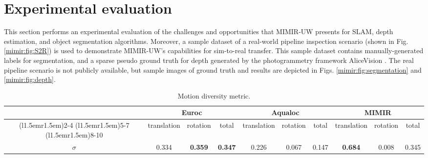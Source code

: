 \section{Experimental evaluation}
\label{mimir:section:evaluationAnalysis}
This section performs an experimental evaluation of the challenges and opportunities that MIMIR-UW presents for \ac{SLAM}, depth estimation, and object segmentation algorithms.
Moreover, a sample dataset of a real-world pipeline inspection scenario (shown in Fig. \ref{mimir:fig:S2R}) is used to demonstrate MIMIR-UW's capabilities for sim-to-real transfer. This sample dataset contains manually-generated labels for segmentation, and a sparse pseudo ground truth for depth generated by the photogrammetry framework AliceVision \cite{alicevision2021}. The real pipeline scenario is not publicly available, but sample images of ground truth and results are depicted in Figs. \ref{mimir:fig:segmentation} and  \ref{mimir:fig:depth}.

\begin{table}[b!]
\centering
\footnotesize
\caption{Motion diversity metric.}
\label{mimirtable:comparisonmotiondiv}
\begin{tabular}{ c  c c c  c c c  c c c}
\toprule
\multirow{2}{*}{} & \multicolumn{3}{c}{Euroc}     & \multicolumn{3}{c}{Aqualoc}     & \multicolumn{3}{c}{MIMIR} \\ %
\cmidrule(l{1.5em}r{1.5em}){2-4}
\cmidrule(l{1.5em}r{1.5em}){5-7}
\cmidrule(l{1.5em}r{1.5em}){8-10}

           & translation & rotation & total &   translation & rotation & total &   translation & rotation & total\\
\midrule
$\sigma$   & 0.334       & \textbf{0.359 }   &\textbf{ 0.347} & 0.226           & 0.067      & 0.147   & \textbf{0.684}          & 0.008     & 0.345 \\
\bottomrule
\end{tabular}
\end{table}

